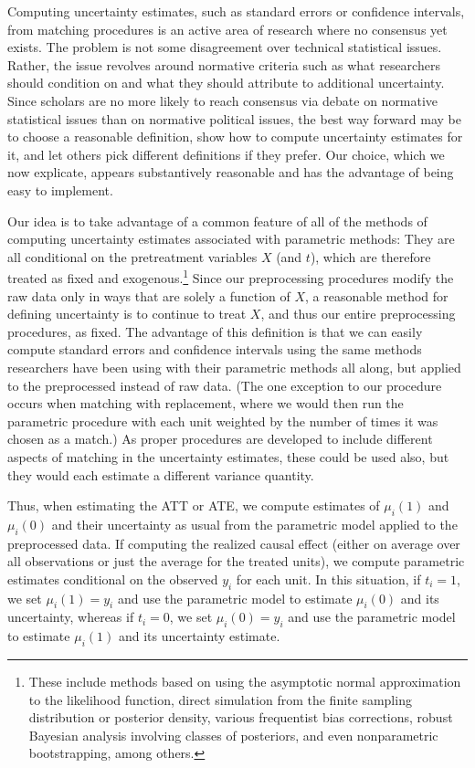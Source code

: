 \documentclass[11pt,titlepage]{article}
\begin{document}
Computing uncertainty estimates, such as standard errors or confidence
intervals, from matching procedures is an active area of research
where no consensus yet exists.  The problem is not some disagreement
over technical statistical issues.  Rather, the issue revolves around
normative criteria such as what researchers should condition on and
what they should attribute to additional uncertainty.  Since scholars
are no more likely to reach consensus via debate on normative
statistical issues than on normative political issues, the best way
forward may be to choose a reasonable definition, show how to
compute uncertainty estimates for it, and let others pick different
definitions if they prefer.  Our choice, which we now explicate,
appears substantively reasonable and has the advantage of being easy
to implement.

Our idea is to take advantage of a common feature of all of the
methods of computing uncertainty estimates associated with parametric
methods: They are all conditional on the pretreatment variables $X$
(and $t$), which are therefore treated as fixed and
exogenous.\footnote{These include methods based on using the
  asymptotic normal approximation to the likelihood function, direct
  simulation from the finite sampling distribution or posterior
  density, various frequentist bias corrections, robust Bayesian
  analysis involving classes of posteriors, and even nonparametric
  bootstrapping, among others.}  Since our preprocessing procedures
modify the raw data only in ways that are solely a function of $X$, a
reasonable method for defining uncertainty is to continue to treat
$X$, and thus our entire preprocessing procedures, as fixed.  The
advantage of this definition is that we can easily compute standard
errors and confidence intervals using the same methods researchers
have been using with their parametric methods all along, but applied
to the preprocessed instead of raw data.  (The one exception to our
procedure occurs when matching with replacement, where we would then
run the parametric procedure with each unit weighted by the number of
times it was chosen as a match.)  As proper procedures are developed
to include different aspects of matching in the uncertainty estimates,
these could be used also, but they would each estimate a different
variance quantity.

Thus, when estimating the ATT or ATE, we compute estimates of
$\mu_i(1)$ and $\mu_i(0)$ and their uncertainty as usual from the
parametric model applied to the preprocessed data.  If computing the
realized causal effect (either on average over all observations or
just the average for the treated units), we compute parametric
estimates conditional on the observed $y_i$ for each unit.  In this
situation, if $t_i=1$, we set $\mu_i(1)=y_i$ and use the parametric
model to estimate $\mu_i(0)$ and its uncertainty, whereas if $t_i=0$,
we set $\mu_i(0)=y_i$ and use the parametric model to estimate
$\mu_i(1)$ and its uncertainty estimate.
\end{document}
